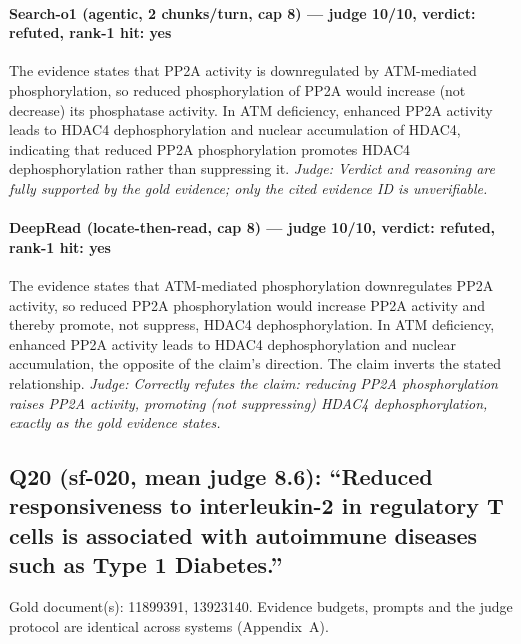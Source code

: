 \documentclass[sigconf, review, anonymous]{acmart}
\begin{document}
\paragraph{Search-o1 (agentic, 2 chunks/turn, cap 8) --- judge 10/10, verdict: refuted, rank-1 hit: yes}
\noindent The evidence states that PP2A activity is downregulated by ATM-mediated phosphorylation, so reduced phosphorylation of PP2A would increase (not decrease) its phosphatase activity. In ATM deficiency, enhanced PP2A activity leads to HDAC4 dephosphorylation and nuclear accumulation of HDAC4, indicating that reduced PP2A phosphorylation promotes HDAC4 dephosphorylation rather than suppressing it.
\noindent\small\textit{Judge: Verdict and reasoning are fully supported by the gold evidence; only the cited evidence ID is unverifiable.}
\paragraph{DeepRead (locate-then-read, cap 8) --- judge 10/10, verdict: refuted, rank-1 hit: yes}
\noindent The evidence states that ATM-mediated phosphorylation downregulates PP2A activity, so reduced PP2A phosphorylation would increase PP2A activity and thereby promote, not suppress, HDAC4 dephosphorylation. In ATM deficiency, enhanced PP2A activity leads to HDAC4 dephosphorylation and nuclear accumulation, the opposite of the claim's direction. The claim inverts the stated relationship.
\noindent\small\textit{Judge: Correctly refutes the claim: reducing PP2A phosphorylation raises PP2A activity, promoting (not suppressing) HDAC4 dephosphorylation, exactly as the gold evidence states.}

\subsection{Q20 (sf-020, mean judge 8.6): ``Reduced responsiveness to interleukin-2 in regulatory T cells is associated with autoimmune diseases such as Type 1 Diabetes.''}
\label{app:q20}
\noindent Gold document(s): 11899391, 13923140. Evidence budgets, prompts and the judge protocol are identical across systems (Appendix~A).
\end{document}
